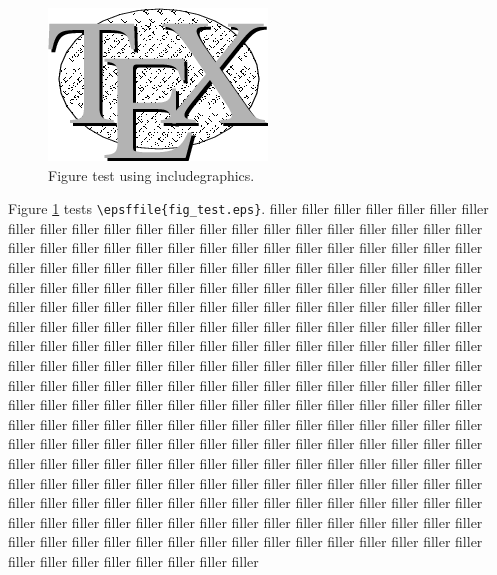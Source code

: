 \documentclass{article}
\begin{document}
\begin{figure}
\includegraphics{fig_test}
\caption{Figure test using includegraphics.} 
\label{figure1}
\end{figure}

Figure \ref{figure1} tests \verb#\epsffile{fig_test.eps}#.
filler filler filler filler filler filler filler filler filler
filler filler filler filler filler filler filler filler filler
filler filler filler filler filler filler filler filler filler
filler filler filler filler filler filler filler filler filler
filler filler filler filler filler filler filler filler filler
filler filler filler filler filler filler filler filler filler
filler filler filler filler filler filler filler filler filler
filler filler filler filler filler filler filler filler filler
filler filler filler filler filler filler filler filler filler
filler filler filler filler filler filler filler filler filler
filler filler filler filler filler filler filler filler filler
filler filler filler filler filler filler filler filler filler
filler filler filler filler filler filler filler filler filler
filler filler filler filler filler filler filler filler filler
filler filler filler filler filler filler filler filler filler
filler filler filler filler filler filler filler filler filler
filler filler filler filler filler filler filler filler filler
filler filler filler filler filler filler filler filler filler
filler filler filler filler filler filler filler filler filler
filler filler filler filler filler filler filler filler filler
filler filler filler filler filler filler filler filler filler
filler filler filler filler filler filler filler filler filler
filler filler filler filler filler filler filler filler filler
filler filler filler filler filler filler filler filler filler
filler filler filler filler filler filler filler filler filler
filler filler filler filler filler filler filler filler filler
filler filler filler filler filler filler filler filler filler
filler filler filler filler filler filler filler filler filler
filler filler filler filler filler filler filler filler filler
filler filler filler filler filler filler filler filler filler
\end{document}
